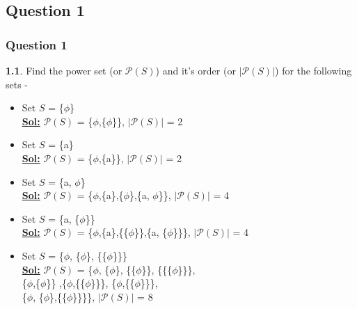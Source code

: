 \documentclass[xcolor=svgnames]{beamer}
\begin{document}
\subsection{Question 1}
\begin{frame}
\frametitle{Question 1}

\textbf{1.1}. Find the power set (or $\mathcal{P}(S)$) and it's order (or $|\mathcal{P}(S)|$) for the following sets - 
\begin{itemize}
    \item Set $S$ = \{$\phi$\}
    \\ \textbf{\underline{Sol:}} $\mathcal{P}(S)$ = \big\{$\phi$,\{$\phi$\}\big\}, $|\mathcal{P}(S)|$ = 2
    \item Set $S$ = \{a\}
    \\ \textbf{\underline{Sol:}} $\mathcal{P}(S)$ = \big\{$\phi$,\{a\}\big\}, $|\mathcal{P}(S)|$ = 2
    \item Set $S$ = \{a, $\phi$\}
    \\ \textbf{\underline{Sol:}} $\mathcal{P}(S)$ = \Big\{$\phi$,\{a\},\{$\phi$\},\{a, $\phi$\}\Big\}, $|\mathcal{P}(S)|$ = 4
    \item Set $S$ = \{a, \{$\phi$\}\}
    \\ \textbf{\underline{Sol:}} $\mathcal{P}(S)$ = \Big\{$\phi$,\{a\},\big\{\{$\phi$\}\big\},\big\{a, \{$\phi$\}\big\}\Big\}, $|\mathcal{P}(S)|$ = 4
    \item Set $S$ = \{$\phi$, \{$\phi$\}, \{\{$\phi$\}\}\} 
    \\ \textbf{\underline{Sol:}} $\mathcal{P}(S)$ = \Big\{$\phi$, \{$\phi$\}, \big\{\{$\phi$\}\big\}, \big\{\big\{\{$\phi$\}\big\}\big\}, \\ 
    \hspace{2.3cm} \big\{$\phi$,\{$\phi$\}\big\} ,\big\{$\phi$,\{\{$\phi$\}\}\big\},
    \big\{$\phi$,\{\{$\phi$\}\}\big\}, \\
    \hspace{2.3cm} \big\{$\phi$, \{$\phi$\},\{\{$\phi$\}\}\big\}\Big\}, $|\mathcal{P}(S)|$ = 8\end{itemize}
\vspace{3mm}
\end{frame}
\end{document}
